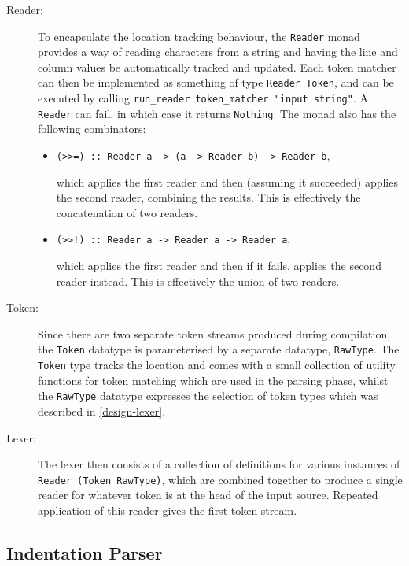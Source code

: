 \begin{description}
  \item[Reader:] To encapsulate the location tracking behaviour, the
    \texttt{Reader} monad provides a way of reading characters from a string and
    having the line and column values be automatically tracked and updated. Each
    token matcher can then be implemented as something of type \texttt{Reader
    Token}, and can be executed by calling \texttt{run\_reader token\_matcher
    "input string"}. A \texttt{Reader} can fail, in which case it returns
    \texttt{Nothing}. The monad also has the following combinators:
    \begin{itemize}
      \item
        \texttt{(>>=) :: Reader a -> (a -> Reader b) -> Reader b},
        
        which applies the first reader and then (assuming it succeeded) applies
        the second reader, combining the results. This is effectively
        the concatenation of two readers.
      \item
        \texttt{(>>!) :: Reader a -> Reader a -> Reader a},
        
        which applies the first reader and then if it fails, applies the second
        reader instead. This is effectively the union of two readers.
    \end{itemize}
  \item[Token:] Since there are two separate token streams produced during
    compilation, the \texttt{Token} datatype is parameterised by a separate
    datatype, \texttt{RawType}. The \texttt{Token} type tracks the location and
    comes with a small collection of utility functions for token matching which
    are used in the parsing phase, whilst the \texttt{RawType} datatype
    expresses the selection of token types which was described in
    \ref{design-lexer}.
  \item[Lexer:] The lexer then consists of a collection of definitions for
    various instances of \texttt{Reader (Token RawType)}, which are combined
    together to produce a single reader for whatever token is at the head of the
    input source. Repeated application of this reader gives the first token
    stream.
\end{description}

\subsection{Indentation Parser}

